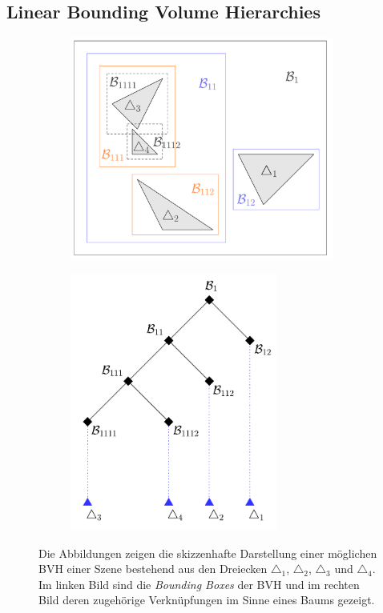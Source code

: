 \documentclass[crop=false]{standalone}
\begin{document}
    \subsection{Linear Bounding Volume Hierarchies} %
    \label{sub:linear_bounding_volume_hierarchies}
      \begin{figure}[h]
        \center
        \begin{subfigure}[b]{0.49\textwidth}
          \center
          \includegraphics[width=0.95\textwidth]{images/bvh_bounding_boxes.pdf}
        \end{subfigure}
        \begin{subfigure}[b]{0.49\textwidth}
          \center
          \includegraphics[width=0.75\textwidth]{images/bvh_tree.pdf}
        \end{subfigure}
        \caption{%
          Die Abbildungen zeigen die skizzenhafte Darstellung einer möglichen BVH einer Szene bestehend aus den Dreiecken $\triangle_1$, $\triangle_2$, $\triangle_3$ und $\triangle_4$.
          Im linken Bild sind die \textit{Bounding Boxes} der BVH und im rechten Bild deren zugehörige Verknüpfungen im Sinne eines Baums gezeigt.
        }
      \end{figure}
\end{document}
